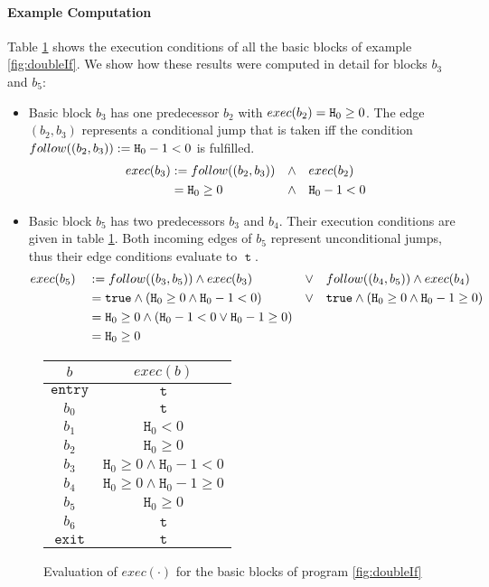 \paragraph{Example Computation}
Table \ref{tab:exec} shows the execution conditions of all the basic blocks of example \ref{fig:doubleIf}. We show how these results were computed in detail for blocks $b_3$ and $b_5$:
\begin{itemize}
    \item Basic block $b_3$ has one predecessor $b_2$ with $exec(b_2) = \mathtt{H}_0 \geq 0$. The edge $(b_2, b_3)$ represents a conditional jump that is taken iff the condition $follow((b_2, b_3)) := \mathtt{H}_0 - 1 < 0$ is fulfilled.
    \begin{align*}
        exec(b_3) &:= follow((b_2, b_3)) &&\land&& exec(b_2) \\
        &= \mathtt{H}_0 \geq 0 &&\land&& \mathtt{H}_0 - 1 < 0 \\
    \end{align*}
    
    \item Basic block $b_5$ has two predecessors $b_3$ and $b_4$. Their execution conditions are given in table \ref{tab:exec}. Both incoming edges of $b_5$ represent unconditional jumps, thus their edge conditions evaluate to $\mttt$.
    \begin{alignat*}{2}
        exec(b_5) \quad &:= follow((b_3, b_5)) \land exec(b_3) \quad &\lor & \quad follow((b_4, b_5)) \land exec(b_4)\\
        &= \mathtt{true} \land (\mathtt{H}_0 \geq 0 \land \mathtt{H}_0 - 1 < 0) &\lor & \quad \mathtt{true} \land (\mathtt{H}_0 \geq 0 \land \mathtt{H}_0 - 1 \geq 0)\\
        &= \mathtt{H}_0 \geq 0 \land (\mathtt{H}_0 - 1 < 0 \lor \mathtt{H}_0 - 1 \geq 0) \\
        &= \mathtt{H}_0 \geq 0
    \end{alignat*}
\end{itemize}

\begin{figure}
    \centering
    \begin{tabular}{ |c|c| } 
        \hline
        $b$ & $exec(b)$ \\
        \hline
        $\mathtt{entry}$ & $\mttt$ \\
        $b_0$ & $\mttt$ \\
        $b_1$ & $\mathtt{H}_0 < 0$ \\
        $b_2$ & $\mathtt{H}_0 \geq 0$ \\
        $b_3$ & $\mathtt{H}_0 \geq 0 \land \mathtt{H}_0 - 1 < 0$ \\
        $b_4$ & $\mathtt{H}_0 \geq 0 \land \mathtt{H}_0 - 1 \geq 0$ \\
        $b_5$ & $\mathtt{H}_0 \geq 0$ \\
        $b_6$ & $\mttt$ \\
        $\mathtt{exit}$ & $\mttt$ \\
        \hline
    \end{tabular}
    \caption{Evaluation of $exec(\cdot)$ for the basic blocks of program \ref{fig:doubleIf}}
    \label{tab:exec}
\end{figure}

